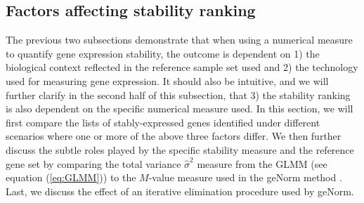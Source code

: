 \documentclass[11pt, a4paper]{article}
\begin{document}
\subsection{Factors affecting stability ranking}\label{section:stabilityMeasure}
The previous two subsections demonstrate that when using a numerical measure
to quantify gene expression stability, the outcome is dependent on 1) the
biological context reflected in the reference sample set used and 2) the
technology used for measuring gene expression. It should also be intuitive,
and we will further clarify in the second half of this subsection, that 3) the
stability ranking is also dependent on the specific numerical measure used.
In this section, we will first compare the lists of stably-expressed genes
identified under different scenarios where one or more of the above three
factors differ.  We then further discuss the subtle roles played by the
specific stability measure and the reference gene set by comparing the total
variance $\hat\sigma^2$ measure from the GLMM (see equation (\ref{eq:GLMM}))
to the $M$-value measure used in the geNorm method \citep{vandesompele2002accurate}.
Last, we discuss the effect of an iterative elimination procedure used by
geNorm.
\end{document}

